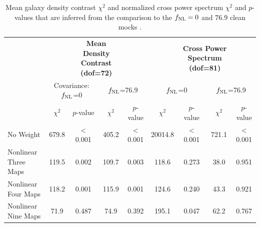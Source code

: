 \begin{table}
  \caption{Mean galaxy density contrast $\chi^{2}$ and normalized cross power spectrum $\chi^{2}$  and $p$-values that are inferred from the comparison to the $f_{\rm NL}=0$ and $76.9$ clean mocks .}\label{tab:chi2test}
  \begin{tabular}{lcccc|cccc}
    \hline
    \hline
    \multirow{3}{*}{} &&
      \multicolumn{2}{c}{\textbf{Mean Density Contrast (dof=72)}} & & &
      \multicolumn{2}{c}{\textbf{Cross Power Spectrum (dof=81)}} \\
    & \multicolumn{2}{c}{Covariance: $f_{\rm NL}$=0} & \multicolumn{2}{c}{$f_{\rm NL}$=76.9} & \multicolumn{2}{c}{$f_{\rm NL}$=0} & \multicolumn{2}{c}{$f_{\rm NL}$=76.9} \\
    \hline
    \textbf{Method} & $\chi^{2}$ & $p$-value & $\chi^{2}$ & $p$-value & $\chi^{2}$ & $p$-value & $\chi^{2}$ & $p$-value \\
    \hline
No Weight & 679.8 & < 0.001 & 405.2 & < 0.001 & 20014.8 & < 0.001 & 721.1 & < 0.001 \\
Nonlinear Three Maps & 119.5 & 0.002 & 109.7 & 0.003 & 118.6 & 0.273 & 38.0 & 0.951 \\
Nonlinear Four Maps & 118.2 & 0.001 & 115.9 & 0.001 & 124.6 & 0.240 & 43.3 & 0.921 \\
Nonlinear Nine Maps & 71.9 & 0.487 & 74.9 & 0.392 & 195.1 & 0.047 & 62.2 & 0.767 \\
    \hline
  \end{tabular}
\end{table}


    





